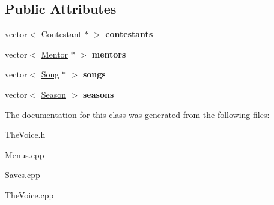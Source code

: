 \subsection*{Public Attributes}
\begin{DoxyCompactItemize}
\item 
\hypertarget{class_the_voice_a1475afbddeec04e431c5f54569ea544a}{}\label{class_the_voice_a1475afbddeec04e431c5f54569ea544a} 
vector$<$ \hyperlink{class_contestant}{Contestant} $\ast$ $>$ {\bfseries contestants}
\item 
\hypertarget{class_the_voice_a781d5ce92671adb0fe6b71f445a3fbd6}{}\label{class_the_voice_a781d5ce92671adb0fe6b71f445a3fbd6} 
vector$<$ \hyperlink{class_mentor}{Mentor} $\ast$ $>$ {\bfseries mentors}
\item 
\hypertarget{class_the_voice_ac651fad37f0dc34e86d690649b24ab2d}{}\label{class_the_voice_ac651fad37f0dc34e86d690649b24ab2d} 
vector$<$ \hyperlink{class_song}{Song} $\ast$ $>$ {\bfseries songs}
\item 
\hypertarget{class_the_voice_abf86218a691f3cf1546fbb81cd575fa7}{}\label{class_the_voice_abf86218a691f3cf1546fbb81cd575fa7} 
vector$<$ \hyperlink{class_season}{Season} $>$ {\bfseries seasons}
\end{DoxyCompactItemize}


The documentation for this class was generated from the following files\+:\begin{DoxyCompactItemize}
\item 
The\+Voice.\+h\item 
Menus.\+cpp\item 
Saves.\+cpp\item 
The\+Voice.\+cpp\end{DoxyCompactItemize}
